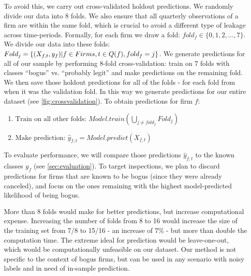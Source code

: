 To avoid this, we carry out cross-validated holdout predictions. We randomly divide our data into 8 folds. We also ensure that all quarterly observations of a firm are within the same fold, which is crucial to avoid a different type of leakage across time-periods. Formally, for each firm we draw a fold: $fold_f \in \{0,1,2,...,7\}$. We divide our data into these folds: $Fold_j = \{(X_{f,t},y_f) \space | \space f \in Firms,\space t \in Q(f), \space fold_f=j\}$. We generate predictions for all of our sample by performing 8-fold cross-validation: train on 7 folds with classes ``bogus'' vs. ``probably legit'' and make predictions on the remaining fold. We then save those holdout predictions for all of the folds - for each fold from when it was the validation fold. In this way we generate predictions for our entire dataset (see \cref{fig:crossvalidation}). To obtain predictions for firm $f$:
\begin{enumerate}
\item $\text{Train on all other folds: } Model.train(\bigcup_{j\neq fold_f} Fold_j) $
\item $\text{Make prediction: }\hat{y}_{f,t} = Model.predict(X_{f,t}) $
\end{enumerate}

To evaluate performance, we will compare those predictions $\hat{y}_{f,t}$ to the known classes $y_f$ (see \cref{sec:evaluation}). To target inspections, we plan to discard predictions for firms that are known to be bogus (since they were already canceled), and focus on the ones remaining with the highest model-predicted likelihood of being bogus. 

More than 8 folds would make for better predictions, but increase computational expense. Increasing the number of folds from 8 to 16 would increase the size of the training set from 7/8 to 15/16 - an increase of 7\% - but more than double the computation time. The extreme ideal for prediction would be leave-one-out, which would be computationally unfeasible on our dataset. Our method is not specific to the context of bogus firms, but can be used in any scenario with noisy labels and in need of in-sample prediction. 


